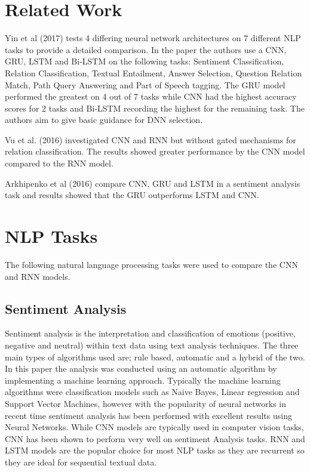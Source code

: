 \documentclass[twocolumn,12pt]{asme2ej}
\begin{document}


\section{Related Work}

Yin et al (2017) tests 4 differing neural network architectures on 7 different NLP tasks to provide a detailed comparison. In the paper the authors use a CNN, GRU, LSTM and Bi-LSTM on the following tasks: Sentiment Classification, Relation Classification, Textual Entailment, Answer Selection, Question Relation Match, Path Query Answering and Part of Speech tagging. The GRU model performed the greatest on 4 out of 7 tasks while CNN had the highest accuracy scores for 2 tasks and Bi-LSTM recording the highest for the remaining task. The authors aim to give basic guidance for DNN selection. 

Vu et al. (2016) investigated CNN and RNN but without gated mechanisms for relation classification. The results showed greater performance by the CNN model compared to the RNN model.

Arkhipenko et al (2016) compare CNN, GRU and LSTM in a sentiment analysis task and results showed that the GRU outperforms LSTM and CNN. 



\section{NLP Tasks}

The following natural language processing tasks were used to compare the CNN and RNN models.

\subsection{Sentiment Analysis}

Sentiment analysis is the interpretation and classification of emotions (positive, negative and neutral) within text data using text analysis techniques. The three main types of algorithms used are; rule based, automatic and a hybrid of the two. In this paper the analysis was conducted using an automatic algorithm by implementing a machine learning approach. Typically the machine learning algorithms were classification models such as Naive Bayes, Linear regression and Support Vector Machines, however with the popularity of neural networks in recent time sentiment analysis has been performed with excellent results using Neural Networks. While CNN models are typically used in computer vision tasks, CNN has been shown to perform very well on sentiment Analysis tasks. RNN and LSTM models are the popular choice for most NLP tasks as they are recurrent so they are ideal for sequential textual data.
\end{document}
